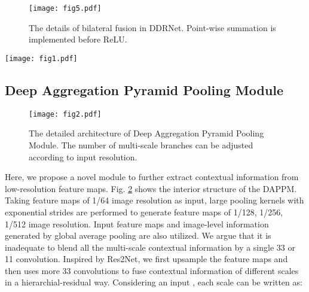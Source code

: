 \documentclass[journal]{IEEEtran}
\begin{document}
\begin{figure}[H]
\centerline{\texttt{[image: fig5.pdf]}}
\caption{The details of bilateral fusion in DDRNet. Point-wise summation is implemented before ReLU.}
\label{fig5}
\end{figure}

\begin{figure*}
\centerline{\texttt{[image: fig1.pdf]}}
\caption{The overview of DDRNets on semantic segmentation. ``RB'' denotes sequential residual basic blocks. ``RBB'' denotes the single residual bottleneck block. ``DAPPM'' denotes the Deep Aggregation Pyramid Pooling Module. ``Seg. Head'' denotes the segmentation head. Black solid lines denote information paths with data processing (including upsampling and downsampling) and black dashed lines denote information paths without data processing. ``sum'' denotes the pointwise summation. Dashed boxes denote the components which are discarded in the inference stage.}
\label{fig1}
\end{figure*}

\subsection{Deep Aggregation Pyramid Pooling Module}
\label{deep}

\begin{figure}[!t]
\centerline{\texttt{[image: fig2.pdf]}}
\caption{The detailed architecture of Deep Aggregation Pyramid Pooling Module. The number of multi-scale branches can be adjusted according to input resolution.}
\label{fig2}
\end{figure}

Here, we propose a novel module to further extract contextual information from low-resolution feature maps. Fig. \ref{fig2} shows the interior structure of the DAPPM. Taking feature maps of 1/64 image resolution as input, large pooling kernels with exponential strides are performed to generate feature maps of 1/128, 1/256, 1/512 image resolution. Input feature maps and image-level information generated by global average pooling are also utilized. We argue that it is inadequate to blend all the multi-scale contextual information by a single 33 or 11 convolution. Inspired by Res2Net\cite{gao2019res2net}, we first upsample the feature maps and then uses more 33 convolutions to fuse contextual information of different scales in a hierarchial-residual way. Considering an input , each scale  can be written as:
\end{document}
